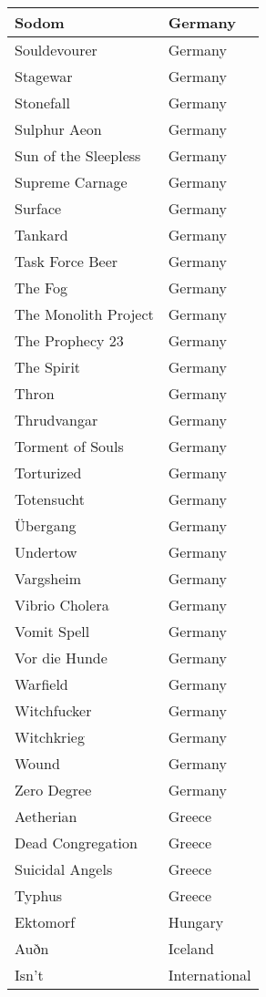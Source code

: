 \documentclass[12pt, a4paper, twoside]{report}
\begin{document}
\begin{center}
\begin{longtable}{|p{5cm}|p{5cm}|}
Sodom & Germany \\ \hline
Souldevourer & Germany \\ \hline
Stagewar & Germany \\ \hline
Stonefall & Germany \\ \hline
Sulphur Aeon & Germany \\ \hline
Sun of the Sleepless & Germany \\ \hline
Supreme Carnage & Germany \\ \hline
Surface & Germany \\ \hline
Tankard & Germany \\ \hline
Task Force Beer & Germany \\ \hline
The Fog & Germany \\ \hline
The Monolith Project & Germany \\ \hline
The Prophecy 23 & Germany \\ \hline
The Spirit & Germany \\ \hline
Thron & Germany \\ \hline
Thrudvangar & Germany \\ \hline
Torment of Souls & Germany \\ \hline
Torturized & Germany \\ \hline
Totensucht & Germany \\ \hline
Übergang & Germany \\ \hline
Undertow & Germany \\ \hline
Vargsheim & Germany \\ \hline
Vibrio Cholera & Germany \\ \hline
Vomit Spell & Germany \\ \hline
Vor die Hunde & Germany \\ \hline
Warfield & Germany \\ \hline
Witchfucker & Germany \\ \hline
Witchkrieg & Germany \\ \hline
Wound & Germany \\ \hline
Zero Degree & Germany \\ \hline
Aetherian & Greece \\ \hline
Dead Congregation & Greece \\ \hline
Suicidal Angels & Greece \\ \hline
Typhus & Greece \\ \hline
Ektomorf & Hungary \\ \hline
Auðn & Iceland \\ \hline
Isn't & International \\ \hline

\end{longtable}
\end{center}
\end{document}
